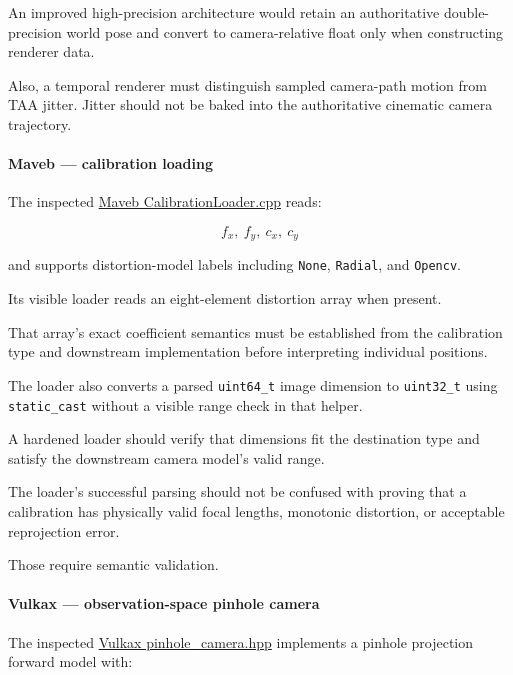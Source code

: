 An improved high-precision architecture would retain an authoritative double-precision world pose and convert to camera-relative float only when constructing renderer data.

Also, a temporal renderer must distinguish sampled camera-path motion from TAA jitter. Jitter should not be baked into the authoritative cinematic camera trajectory.

\paragraph{Maveb --- calibration loading}\label{maveb-calibration-loading}

The inspected \href{https://github.com/swayam8624/Maveb/blob/main/engine/capture/calibration/CalibrationLoader.cpp?utm_source=chatgpt.com}{Maveb CalibrationLoader.cpp} reads:

\[
 f_x,\ f_y,\ c_x,\ c_y
\]

and supports distortion-model labels including \texttt{None}, \texttt{Radial}, and \texttt{Opencv}.

Its visible loader reads an eight-element distortion array when present.

That array's exact coefficient semantics must be established from the calibration type and downstream implementation before interpreting individual positions.

The loader also converts a parsed \texttt{uint64\_t} image dimension to \texttt{uint32\_t} using \texttt{static\_cast} without a visible range check in that helper.

A hardened loader should verify that dimensions fit the destination type and satisfy the downstream camera model's valid range.

The loader's successful parsing should not be confused with proving that a calibration has physically valid focal lengths, monotonic distortion, or acceptable reprojection error.

Those require semantic validation.

\paragraph{Vulkax --- observation-space pinhole camera}\label{vulkax-observation-space-pinhole-camera}

The inspected \href{https://github.com/swayam8624/Vulkax/blob/main/include/vulkax/world/pinhole_camera.hpp?utm_source=chatgpt.com}{Vulkax pinhole\_camera.hpp} implements a pinhole projection forward model with:

